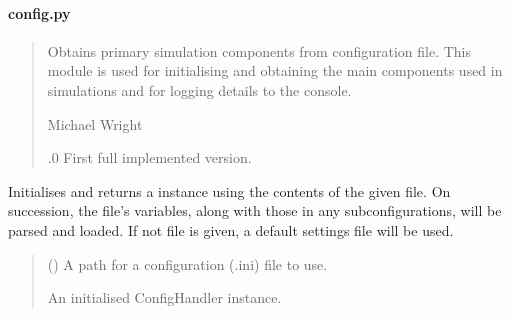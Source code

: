 \documentclass[letterpaper,10pt,english]{sphinxmanual}
\begin{document}
\paragraph{config.py}
\label{\detokenize{modules/input/config:config-py}}\begin{quote}\begin{description}
\sphinxAtStartPar
Obtains primary simulation components from configuration file.
This module is used for initialising and obtaining the main
components used in simulations and for logging details to
the console.

\sphinxAtStartPar
Michael Wright \sphinxhyphen{} 

.0 \sphinxhyphen{} First full implemented version.

\end{description}\end{quote}

\begin{fulllineitems}
\label{\detokenize{modules/input/config:qnav.input.config.get_configuration}}
\pysigstartsignatures
{}
\pysigstopsignatures
\sphinxAtStartPar
Initialises and returns a 
instance using the contents of the given file. On succession, the
file’s variables, along with those in any sub\sphinxhyphen{}configurations,
will be parsed and loaded. If not file is given, a default
settings file will be used.
\begin{quote}\begin{description}
\sphinxAtStartPar
{} () \textendash{} A path for a configuration (.ini) file to use.

\sphinxAtStartPar
An initialised ConfigHandler instance.

\sphinxAtStartPar
{\hyperref[\detokenize{modules/input/config_handler:qnav.input.config_handler.ConfigHandler}]{}}

\end{description}\end{quote}

\end{fulllineitems}
\end{document}
